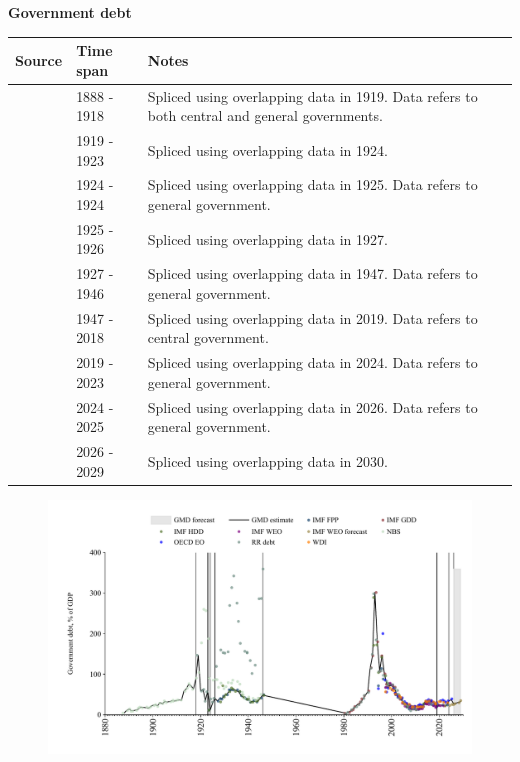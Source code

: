 \documentclass[12pt,a4paper,landscape]{article}
\begin{document}
\begin{adjustbox}{max totalsize={\paperwidth}{\paperheight},center}
\begin{minipage}[t][\textheight][t]{\textwidth}
\vspace*{0.5cm}
{}
\begin{center}
{\Large\bfseries Government debt}
\end{center}
\vspace{0.5cm}
\begin{table}[H]
\centering
\small
\begin{tabular}{|l|l|l|}
\hline
\textbf{Source} & \textbf{Time span} & \textbf{Notes} \\
\hline
\rowcolor{white}\cite{NBS}& 1888 - 1918 &Spliced using overlapping data in 1919. Data refers to both central and general governments.\\
\rowcolor{lightgray}\cite{RR_debt}& 1919 - 1923 &Spliced using overlapping data in 1924. \\
\rowcolor{white}\cite{IMF_FPP}& 1924 - 1924 &Spliced using overlapping data in 1925. Data refers to general government.\\
\rowcolor{lightgray}\cite{RR_debt}& 1925 - 1926 &Spliced using overlapping data in 1927. \\
\rowcolor{white}\cite{IMF_FPP}& 1927 - 1946 &Spliced using overlapping data in 1947. Data refers to general government.\\
\rowcolor{lightgray}\cite{IMF_GDD}& 1947 - 2018 &Spliced using overlapping data in 2019. Data refers to central government.\\
\rowcolor{white}\cite{IMF_FPP}& 2019 - 2023 &Spliced using overlapping data in 2024. Data refers to general government.\\
\rowcolor{lightgray}\cite{OECD_EO}& 2024 - 2025 &Spliced using overlapping data in 2026. Data refers to general government.\\
\rowcolor{white}\cite{IMF_WEO_forecast}& 2026 - 2029 &Spliced using overlapping data in 2030. \\
\hline
\end{tabular}
\end{table}
\begin{figure}[H]
\centering
\includegraphics[width=\textwidth,height=0.6\textheight,keepaspectratio]{graphs/BGR_govdebt_GDP.pdf}
\end{figure}
\end{minipage}
\end{adjustbox}
\end{document}
